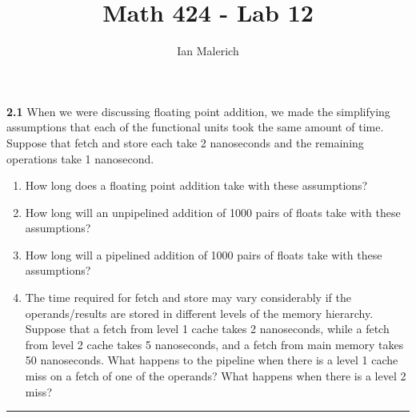 \documentclass[12pt]{jhwhw}
\author{Ian Malerich}
\title{Math 424 - Lab 12}
\begin{document}
\raggedright


\textbf{2.1}
	When we were discussing floating point addition, we made the simplifying
	assumptions that each of the functional units took the same amount of time.
	Suppose that fetch and store each take 2 nanoseconds and the remaining
	operations take 1 nanosecond.
	\begin{enumerate}
		\item How long does a floating point addition take with these assumptions?
		\item How long will an unpipelined addition of 1000 pairs of floats take
			with these assumptions?
		\item How long will a pipelined addition of 1000 pairs of floats take with
			these assumptions?
		\item The time required for fetch and store may vary considerably if the 
			operands/results are stored in different levels of the memory hierarchy. 
			Suppose that a fetch from level 1 cache takes 2 nanoseconds,
			while a fetch from level 2 cache takes 5 nanoseconds, and a fetch
			from main memory takes 50 nanoseconds. What happens to the
			pipeline when there is a level 1 cache miss on a fetch of one of the 
			operands? What happens when there is a level 2 miss?
	\end{enumerate}
\textcolor[RGB]{240,240,240}{\rule{\textwidth}{0.5pt}}\bigbreak
\end{document}
